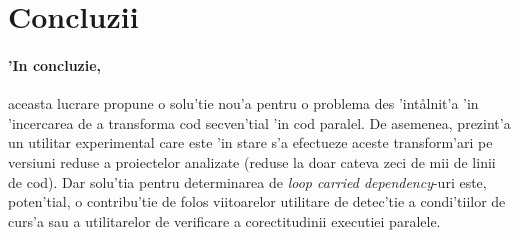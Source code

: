 \section{Concluzii}

\paragraph{'In concluzie,} aceasta lucrare propune o solu'tie nou'a pentru o
problema des 'int\aa lnit'a 'in 'incercarea de a transforma cod secven'tial 'in
cod paralel. De asemenea, prezint'a un utilitar experimental care este 'in stare
s'a efectueze aceste transform'ari pe versiuni reduse a proiectelor analizate
(reduse la doar cateva zeci de mii de linii de cod). Dar solu'tia pentru
determinarea de \emph{loop carried dependency}-uri este, poten'tial, o contribu'tie
de folos viitoarelor utilitare de detec'tie a condi'tiilor de curs'a sau a
utilitarelor de verificare a corectitudinii executiei paralele.

% 
